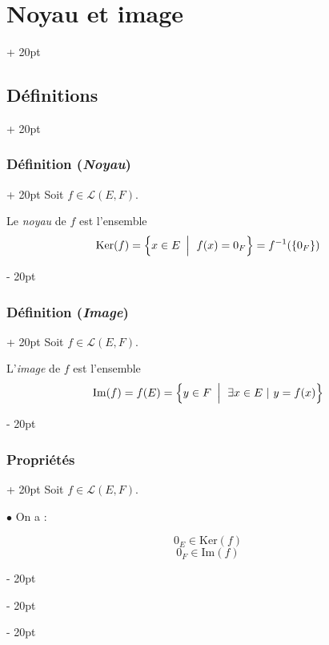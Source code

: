 \documentclass[a4paper, 12pt, twoside]{article}
\newcommand{\lr}[1]{\left( #1 \right)}
\newcommand{\set}[1]{\left\{ #1 \right\}}
\newcommand{\ind}[1][20pt]{\advance\leftskip + #1}
\newcommand{\deind}[1][20pt]{\advance\leftskip - #1}
\newenvironment{indt}[2][20pt]{#2 \par \ind[#1]}{\par \deind} %
\begin{document}
    \begin{indt}{\section{Noyau et image}}
        \begin{indt}{\subsection{Définitions}}
            \begin{indt}{\subsubsection{Définition (\textit{Noyau})}}
                Soit $f \in \mathcal L(E, F)$.

                Le \textit{noyau} de $f$ est l'ensemble
                \[
                    \mathrm{Ker}(f) = \set{x \in E\ \left| \vphantom{\frac a a} \right.\ f(x) = 0_F}
                    = f^{-1}\!\lr{\set{0_F}}
                \]
            \end{indt}

            \vspace{12pt}
            
            \begin{indt}{\subsubsection{Définition (\textit{Image})}}
                Soit $f \in \mathcal L(E, F)$.

                L'\textit{image} de $f$ est l'ensemble
                \[
                    \mathrm{Im}(f) = f(E)
                    = \set{y \in F\ \left| \vphantom{\frac a a} \right.\ \exists x \in E\ |\ y = f(x)}
                \]
            \end{indt}

            \vspace{12pt}
            
            \begin{indt}{\subsubsection{Propriétés}}
                Soit $f \in \mathcal L(E, F)$.

                $\bullet$ On a :

                \[ 0_E \in \mathrm{Ker}(f) \]
                \[ 0_F \in \mathrm{Im}(f) \]


\end{indt}
\end{indt}
\end{indt}
\end{document}

